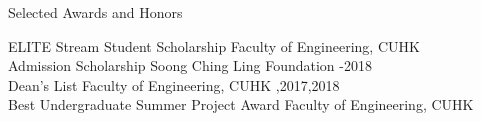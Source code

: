 \begin{rSection}{Selected Awards and Honors}
\begin{tabbing}
    ELITE Stream Student Scholarship                \> Faculty of Engineering, CUHK                             \\
    Admission Scholarship                             \> Soong Ching Ling Foundation  -2018 \\
    Dean’s List          \> Faculty of Engineering, CUHK                       ,2017,2018 \\
    Best Undergraduate Summer Project Award \> Faculty of Engineering, CUHK            \\
\end{tabbing}
\end{rSection}

